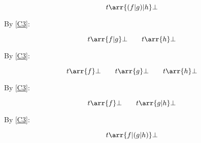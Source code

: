 \begin{equation}
t \arr{(f|g)|h} \bot
\end{equation}

By \eqref{C3}:

\begin{equation}
t \arr{f|g} \bot \qquad t \arr{h} \bot
\end{equation}

By \eqref{C3}:

\begin{equation}
t \arr{f} \bot \qquad t \arr{g} \bot \qquad t \arr{h} \bot
\end{equation}

By \eqref{C3}:

\begin{equation}
t \arr{f} \bot \qquad t \arr{g|h} \bot
\end{equation}

By \eqref{C3}:

\begin{equation}
t \arr{f|(g|h)} \bot
\end{equation}
